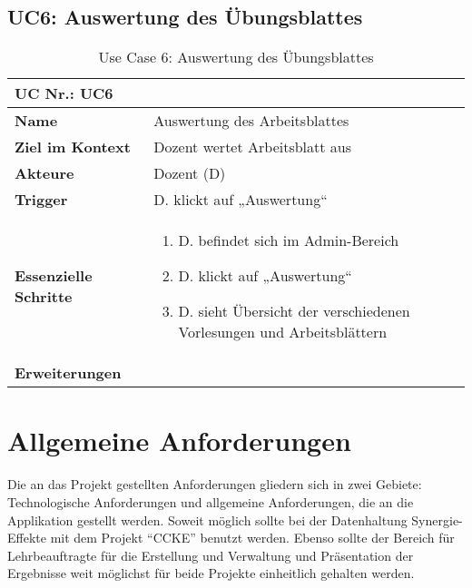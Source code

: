 \begin{table}[h]
\subsection{UC6: Auswertung des Übungsblattes}\label{uc:UC6}
	\begin{tabular}{|p{3cm}|p{11.06cm}|}
	\hline
		\multicolumn{2}{|l|}{\textbf{UC Nr.: UC6} }   \\ \hline
		\textbf{Name}                 &     Auswertung des Arbeitsblattes    \\ \hline
		\textbf{Ziel im Kontext}      &     Dozent wertet Arbeitsblatt aus   \\ \hline
		\textbf{Akteure}              &     Dozent (D)    \\ \hline
		\textbf{Trigger}              &     D. klickt auf „Auswertung“    \\ \hline
		\textbf{Essenzielle Schritte} & 
			\begin{enumerate}
			  \item D. befindet sich im Admin-Bereich
			  \item D. klickt auf „Auswertung“
			  \item D. sieht Übersicht der verschiedenen Vorlesungen und Arbeitsblättern
			\end{enumerate}
		\\ \hline
		\textbf{Erweiterungen} 		  &         \\ \hline
	\end{tabular}
	\caption{Use Case 6: Auswertung des Übungsblattes}
\end{table}\FloatBarrier

 

\section{Allgemeine Anforderungen}
Die an das Projekt gestellten Anforderungen gliedern sich in zwei Gebiete:
Technologische Anforderungen und allgemeine Anforderungen, die an die
Applikation gestellt werden. Soweit möglich sollte bei der Datenhaltung
Synergie-Effekte mit dem Projekt "`CCKE"' benutzt werden. Ebenso sollte der
Bereich für Lehrbeauftragte für die Erstellung und Verwaltung und Präsentation
der Ergebnisse weit möglichst für beide Projekte einheitlich gehalten werden.

